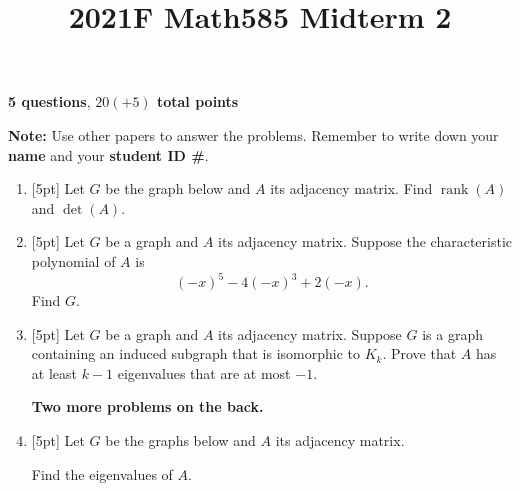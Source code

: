\documentclass{article}
\title{2021F Math585 Midterm 2}
\date{\vspace{-1cm}}
\newcommand{\rank}{\operatorname{rank}}
\begin{document}
\maketitle
\large

\textbf{5 questions}, \textbf{$20(+5)$ total points}

\textbf{Note:}  Use other papers to answer the problems.  Remember to write down your \textbf{name} and your \textbf{student ID \#}.

\begin{enumerate}
\setlength\itemsep{2em}

\item{} [5pt] Let $G$ be the graph below and $A$ its adjacency matrix.  Find $\rank(A)$ and $\det(A)$.

\begin{center}
\end{center}

\item{} [5pt] Let $G$ be a graph and $A$ its adjacency matrix.  Suppose the characteristic polynomial of $A$ is 
\[(-x)^5 -4(-x)^3 + 2(-x).\]
Find $G$.

\item{} [5pt] Let $G$ be a graph and $A$ its adjacency matrix.  Suppose $G$ is a graph containing an induced subgraph that is isomorphic to $K_k$.  Prove that $A$ has at least $k - 1$ eigenvalues that are at most $-1$.

\vfill

\textbf{Two more problems on the back.}

\newpage
\item{} [5pt] Let $G$ be the graphs below and $A$ its adjacency matrix.  

\begin{center}
\end{center}
Find the eigenvalues of $A$.


\end{enumerate}
\end{document}
